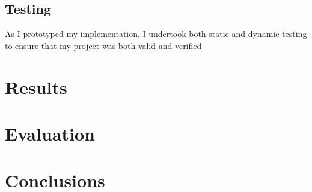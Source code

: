 \documentclass[12pt,a4paper]{article}
\begin{document}
\subsection{Testing}

As I prototyped my implementation, I undertook both static and dynamic testing to ensure that my project was both valid and verified 

\section{Results}

\section{Evaluation}

\section{Conclusions}


\end{document}
